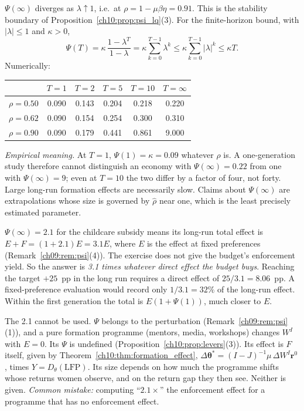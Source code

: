 \documentclass[../solutions_manual.tex]{subfiles}
\begin{document}
 $\Psi(\infty)$ diverges as $\lambda \uparrow 1$, i.e.\ at $\rho = 1 - \mu\beta\eta = 0.91$. This is the stability boundary of Proposition~\ref{ch10:prop:psi_lq}(3). For the finite-horizon bound, with $|\lambda| \le 1$ and $\kappa > 0$,
\[
\Psi(T) = \kappa\,\frac{1-\lambda^T}{1-\lambda} = \kappa\sum_{k=0}^{T-1}\lambda^k \le \kappa\sum_{k=0}^{T-1}|\lambda|^k \le \kappa T .
\]
Numerically:
\begin{center}
\begin{tabular}{lccccc}
\toprule
& $T=1$ & $T=2$ & $T=5$ & $T=10$ & $T=\infty$ \\
\midrule
$\rho = 0.50$ & 0.090 & 0.143 & 0.204 & 0.218 & 0.220 \\
$\rho = 0.62$ & 0.090 & 0.154 & 0.254 & 0.300 & 0.310 \\
$\rho = 0.90$ & 0.090 & 0.179 & 0.441 & 0.861 & 9.000 \\
\bottomrule
\end{tabular}
\end{center}
\textit{Empirical meaning.} At $T = 1$, $\Psi(1) = \kappa = 0.09$ whatever $\rho$ is. A one-generation study therefore cannot distinguish an economy with $\Psi(\infty) = 0.22$ from one with $\Psi(\infty) = 9$; even at $T = 10$ the two differ by a factor of four, not forty. Large long-run formation effects are necessarily slow. Claims about $\Psi(\infty)$ are extrapolations whose size is governed by $\hat\rho$ near one, which is the least precisely estimated parameter.

 $\Psi(\infty) = 2.1$ for the childcare subsidy means its long-run total effect is $E + F = (1 + 2.1)E = 3.1E$, where $E$ is the effect at fixed preferences (Remark~\ref{ch09:rem:psi}(4)). The exercise does not give the budget's enforcement yield. So the answer is \emph{3.1 times whatever direct effect the budget buys}. Reaching the target $+25$~pp in the long run requires a direct effect of $25/3.1 = 8.06$~pp. A fixed-preference evaluation would record only $1/3.1 = 32\%$ of the long-run effect. Within the first generation the total is $E(1 + \Psi(1))$, much closer to $E$.

 The 2.1 cannot be used. $\Psi$ belongs to the perturbation (Remark~\ref{ch09:rem:psi}(1)), and a pure formation programme (mentors, media, workshops) changes $W^I$ with $E = 0$. Its $\Psi$ is undefined (Proposition~\ref{ch10:prop:levers}(3)). Its effect is $F$ itself, given by Theorem~\ref{ch10:thm:formation_effect}, $\Delta\boldsymbol{\theta}^* = (I - J)^{-1}\mu\,\Delta W^I\mathbf{r}^0$, times $Y = D_\theta(\text{LFP})$. Its size depends on how much the programme shifts whose returns women observe, and on the return gap they then see. Neither is given. \textit{Common mistake:} computing ``$2.1\times$'' the enforcement effect for a programme that has no enforcement effect.
\end{document}
